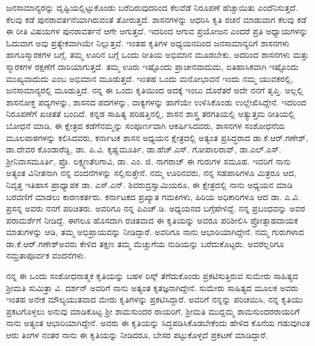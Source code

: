 ಜನಸಾಮಾನ್ಯರನ್ನು ದೃಷ್ಟಿಯಲ್ಲಿಟ್ಟುಕೊಂಡು ಬರೆದಿರುವುದರಿಂದ ಕೆಲವೆಡೆ ನಿರೂಪಣೆ ಹೆಚ್ಚಾಯಿತು ಎಂದೆನಿಸು\-ತ್ತದೆ. ಕೆಲವು ಕಡೆ ಪುನರಾವರ್ತನೆಯಾಗಿರುವಂತೆ ತೋರುತ್ತದೆ. ಶಾಸನಗಳನ್ನು ಆಧರಿಸಿ ಕೃತಿ ರಚನೆ ಮಾಡುವಾಗ ಕೆಲವು ಕಡೆ ಈ ರೀತಿ ವಿಷಯಗಳ ಪುನರಾವರ್ತನೆ ಆಗೇ ಆಗುತ್ತದೆ. ಇದರಿಂದ ಆಗುವ ಪ್ರಯೋಜನ ಎಂದರೆ ಪ್ರತಿ ಅಧ್ಯಾಯಗಳನ್ನು ಓದುವಾಗ ಅವು ಪ್ರತ್ಯೇಕವಾಗಿಯೇ ನಿಲ್ಲುತ್ತವೆ. ಇಂತಹ ಕೃತಿಗಳ ಅಧ್ಯಯನದಿಂದ ಜನಸಾಮಾನ್ಯರಿಗೆ ಶಾಸನಗಳು ಹಾಗೂ\break ಸ್ಮಾರಕಗಳ ಬಗ್ಗೆ, ತಮ್ಮ ಊರಿನ ಬಗ್ಗೆ ಒಂದು ರೀತಿಯ ಅಭಿಮಾನ ಮೂಡಬೇಕು, ಅದರಿಂದ ಶಾಸನಗಳು ಮತ್ತು ಸ್ಮಾರಕಗಳ ರಕ್ಷಣೆಗೆ ದಾರಿಯಾಗುತ್ತದೆ. ತಮ್ಮ ಊರು ಇಷ್ಟೊಂದು ಪ್ರಾಚೀನವಾದುದು, ಐತಿಹಾಸಿಕವಾಗಿ ಇಷ್ಟೊಂದು ಮುಖ್ಯವಾದುದು ಎಂಬ ಅಭಿಮಾನ ಮೂಡುತ್ತದೆ. ಇಂತಹ ಒಂದು ಮನೋಭಾವನೆ ಇಂದು ನಮ್ಮ ಯುವಕರಲ್ಲಿ, ಜನಸಾಮಾನ್ಯರಲ್ಲಿ ಮೂಡು\-ತ್ತಿದೆ. ನನ್ನ ಈ ಒಂದು ಕೃತಿಯಿಂದ ಅದಕ್ಕೆ ಇಂಬು ದೊರೆತರೆ ಅದೇ ನನಗೆ ತೃಪ್ತಿ. ಅಲ್ಲಲ್ಲಿ ಶಾಸನೋಕ್ತ ಪದ್ಯಗಳನ್ನು, ಶಾಸನದ ಪದಗಳನ್ನು, ವಾಕ್ಯಗಳನ್ನು ಹಾಗೆಯೇ ಉಳಿಸಿಕೊಂಡು ಉಲ್ಲೇಖಿಸಿದ್ದೇನೆ. ಇದರಿಂದ ನಿರೂಪಣೆಗೆ ಖಚಿತತೆ ಬಂದಿದೆ. ಕನ್ನಡ ಸಾಹಿತ್ಯ ಪರಿಷತ್ತಿನಲ್ಲಿ, ಶಾಸನ ಶಾಸ್ತ್ರ ತರಗತಿಯಲ್ಲಿ ಅತ್ಯುತ್ತಮ ರೀತಿಯಲ್ಲಿ ಬೋಧನೆ ಮಾಡಿ, ಈ ಕ್ಷೇತ್ರದ ಕಡೆಗೆ\break ನಮ್ಮನ್ನು ಸಂಪೂರ್ಣವಾಗಿ ಆಕರ್ಷಿಸಿದವರು, ಶಾಸನಗಳ ಸಂಶೋಧನೆಯ ಮೂಲಪಾಠಗಳನ್ನು ಕಲಿಸಿದವರು, ಕರ್ನಾಟಕ ಶಾಸನ ಅಧ್ಯಯನ ಕ್ಷೇತ್ರದಲ್ಲಿ ಅತ್ಯಂತ ಪ್ರಸಿದ್ಧರಾದ ಡಾ.ಕೆ.ಆರ್​.ಗಣೇಶ್​, ಡಾ.ದೇವರ ಕೊಂಡಾರೆಡ್ಡಿ, ಡಾ. ಪಿ.ವಿ. ಕೃಷ್ಣಮೂರ್ತಿ, ಡಾ.ಹೆಚ್​.ಎಸ್​. ಗೋಪಾಲರಾವ್​, ಡಾ.ಎಲ್​.ಎಸ್​. ಶ‍್ರೀನಿವಾಸಮೂರ್ತಿ, ಪ್ರೊ. ಲಕ್ಷ್ಮಣತೆಲಗಾವಿ, ಡಾ. ಎಂ. ಜಿ. ನಾಗರಾಜ್ ಈ ಗುರುಗಳ ಸಮೂಹ. ಇವರಿಗೆ ನಾನು ಅತ್ಯಂತ ವಿನೀತನಾಗಿ ನನ್ನ ವಂದನೆಗಳನ್ನು ಸಲ್ಲಿಸುತ್ತೇನೆ. ನಮ್ಮ ಊರಿನವರು, ನನ್ನ ಸಹಪಾಠಿಗಳೂ ಮಿತ್ರರೂ ಆದ, ನಿವೃತ್ತ ಇತಿಹಾಸ ಪ್ರಾಧ್ಯಾಪಕ ಡಾ. ಎಸ್​.ಎನ್​. ಶಿವರುದ್ರಸ್ವಾಮಿಯರೂ, ಈ ಕ್ಷೇತ್ರದಲ್ಲಿ ನಾನು ಅಧ್ಯಯನ ಮಾಡಿ ಬರವಣಿಗೆ ಮಾಡಲು ಕಾರಣಕರ್ತರು. ಕರ್ನಾಟಕದ ಪ್ರಖ್ಯಾತ ಗಮಕಿಗಳು, ಹಿರಿಯ ಅಧಿಕಾರಿಗಳೂ ಆದ ಡಾ. ಎ.ವಿ. ಪ್ರಸನ್ನ ಅವರು ನನಗೆ ಪರಿಚಿತರು. ಅವರಿಗೂ ನನ್ನ ಪಿಎಚ್​.ಡಿ. ಅಧ್ಯಯನದ ಬಗ್ಗೆ\break ಹೇಳಿದ್ದೆ. ನನ್ನ ಪ್ರಬಂಧವನ್ನು ಅವರ ಪರಾಮರ್ಶೆಗೆ ನೀಡಿದ್ದೆ. ಈಗಲೂ ಹೊಸದಾಗಿ ರಚಿತವಾದ ಈ ಕೃತಿಯನ್ನು ಅವರೂ ಪರಿಶೀಲಿಸಿ ಪ್ರೋತ್ಸಾಹದಾಯಕ ಮಾತುಗಳನ್ನು ಆಡಿ, ತಮ್ಮ ಅಭಿಪ್ರಾಯವನ್ನು ನೀಡಿದ್ದಾರೆ. ಅವರಿಗೂ ನಾನು ಆಭಾರಿಯಾಗಿದ್ದೇನೆ. ನಮ್ಮ ಗುರುಗಳಾದ ಡಾ.ಕೆ.ಆರ್​.ಗಣೇಶ್​ ಅವರು ಕೇಳಿದ ತಕ್ಷಣ ತಮ್ಮ ಮೆಚ್ಚುಗೆಯ ನುಡಿಯನ್ನು ಬರೆದು\-ಕೊಟ್ಟರು. ಅವರೆಲ್ಲರಿಗೂ ನಮ್ರತಾಪೂರ್ವಕ ವಂದನೆಗಳು.

ನನ್ನ ಈ ಒಂದು ಸಂಶೋಧನಾತ್ಮಕ ಕೃತಿಯನ್ನು ಬಹಳ ರಿಸ್ಕ್​ ತೆಗೆದುಕೊಂಡು ಪ್ರಕಟಿಸುತ್ತಿರುವ ಸುಮೇರು ಸಾಹಿತ್ಯದ ಶ‍್ರೀಮತಿ ಸುಮಿತ್ರಾ ವಿ. ದರ್ಶನ್​ ಅವರಿಗೆ ನಾನು ಅತ್ಯಂತ ಕೃತಜ್ಞನಾಗಿದ್ದೇನೆ. ಸುಮೇರು ಸಾಹಿತ್ಯದ ಮೂಲಕ ಅವರು ಇಂತಹ ಅನೇಕ ಮೌಲ್ಯಯುತವಾದ ಮೇರು ಕೃತಿಗಳನ್ನು ಪ್ರಕಟಿಸಿದ್ದಾರೆ. ಅವರಿಗೆ ನನ್ನನ್ನು ಪರಿಚಯಿಸಿ, ನನ್ನ ಕೃತಿಯು ಪ್ರಕಟಗೊಳ್ಳಲು ಅನುವು ಮಾಡಿಕೊಟ್ಟ ಶ‍್ರೀ ಶಾಮಸುಂದರ ರಾಯರಿಗೆ, ಶ‍್ರೀಮತಿ ಮುದ್ದಮ್ಮ ಶಾಮಸುಂದರರಾಯರಿಗೆ ನಾನು ಅತ್ಯಂತ ಆಭಾರಿಯಾಗಿದ್ದೇನೆ. ಅವರು ಈ ಕೃತಿಯನ್ನು ಸಿದ್ಧಪಡಿಸಿಕೊಡಬೇಕೆಂದು ಹೇಳಿದ ಕೊನೆಯ ಗಡುವುಗಿಂತ ಆರು ತಿಂಗಳ ನಂತರ ನಾನು ಈ ಕೃತಿಯನ್ನು ನೀಡಿದರೂ, ಬೇಸರ ಪಟ್ಟುಕೊಳ್ಳದೆ ಪ್ರಕಟಣೆ ಮಾಡಿದ್ದಾರೆ.

